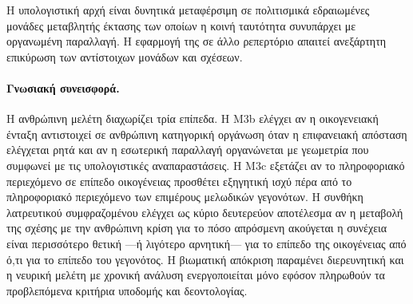 \documentclass[11pt,a4paper]{article}
\begin{document}
Η υπολογιστική αρχή είναι δυνητικά μεταφέρσιμη σε πολιτισμικά εδραιωμένες μονάδες μεταβλητής έκτασης των οποίων η κοινή ταυτότητα συνυπάρχει με οργανωμένη παραλλαγή. Η εφαρμογή της σε άλλο ρεπερτόριο απαιτεί ανεξάρτητη επικύρωση των αντίστοιχων μονάδων και σχέσεων.

\paragraph{Γνωσιακή συνεισφορά.}
Η ανθρώπινη μελέτη διαχωρίζει τρία επίπεδα. Η M3b ελέγχει αν η οικογενειακή ένταξη αντιστοιχεί σε ανθρώπινη κατηγορική οργάνωση όταν η επιφανειακή απόσταση ελέγχεται ρητά και αν η εσωτερική παραλλαγή οργανώνεται με γεωμετρία που συμφωνεί με τις υπολογιστικές αναπαραστάσεις. Η M3c εξετάζει αν το πληροφοριακό περιεχόμενο σε επίπεδο οικογένειας προσθέτει εξηγητική ισχύ πέρα από το πληροφοριακό περιεχόμενο των επιμέρους μελωδικών γεγονότων. Η συνθήκη λατρευτικού συμφραζομένου ελέγχει ως κύριο δευτερεύον αποτέλεσμα αν η μεταβολή της σχέσης με την ανθρώπινη κρίση για το πόσο απρόσμενη ακούγεται η συνέχεια είναι περισσότερο θετική ---ή λιγότερο αρνητική--- για το επίπεδο της οικογένειας από ό,τι για το επίπεδο του γεγονότος. Η βιωματική απόκριση παραμένει διερευνητική και η νευρική μελέτη με χρονική ανάλυση ενεργοποιείται μόνο εφόσον πληρωθούν τα προβλεπόμενα κριτήρια υποδομής και δεοντολογίας.
\end{document}
